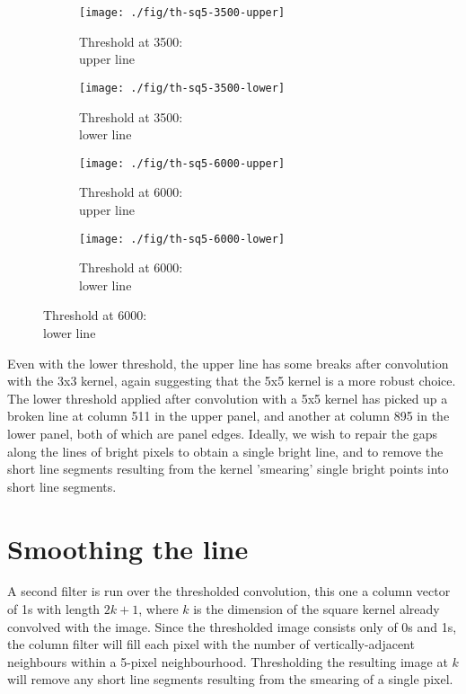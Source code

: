 \documentclass[10pt,fleqn]{article}
\begin{document}
\begin{figure}[!ht]
\caption{High and low thresholds applied after convolution with 5x5 kernel}
\label{fig:hi-lo-thresholds-sq5}
\centering
%
\begin{subfigure}[t]{0.24\textwidth}
\caption{Threshold at 3500: \\upper line}
\texttt{[image: ./fig/th-sq5-3500-upper]}
\end{subfigure}
%
\begin{subfigure}[t]{0.24\textwidth}
\caption{Threshold at 3500: \\lower line}
\texttt{[image: ./fig/th-sq5-3500-lower]}
\end{subfigure}
%
\begin{subfigure}[t]{0.24\textwidth}
\caption{Threshold at 6000: \\upper line}
\texttt{[image: ./fig/th-sq5-6000-upper]}
\end{subfigure}
%
\begin{subfigure}[t]{0.24\textwidth}
\caption{Threshold at 6000: \\lower line}
\texttt{[image: ./fig/th-sq5-6000-lower]}
\end{subfigure}
%
\end{figure}

Even with the lower threshold, the upper line has some breaks after convolution with the 3x3 kernel, again suggesting that the 5x5 kernel is a more robust choice. The lower threshold applied after convolution with a 5x5 kernel has picked up a broken line at column 511 in the upper panel, and another at column 895 in the lower panel, both of which are panel edges. Ideally, we wish to repair the gaps along the lines of bright pixels to obtain a single bright line, and to remove the short line segments resulting from the kernel 'smearing' single bright points into short line segments.

\section{Smoothing the line}

A second filter is run over the thresholded convolution, this one a column vector of 1s with length $2k+1$, where $k$ is the dimension of the square kernel already convolved with the image. Since the thresholded image consists only of 0s and 1s, the column filter will fill each pixel with the number of vertically-adjacent neighbours within a 5-pixel neighbourhood. Thresholding the resulting image at $k$ will remove any short line segments resulting from the smearing of a single pixel.
\end{document}
